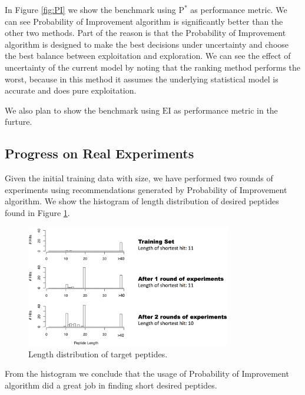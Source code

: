 \documentclass[opre,nonblindrev]{informs3} %
\newcommand{\EI}{\mathrm{EI}}
\newcommand{\PI}{\text{P}^*}
\begin{document}
In Figure \ref{fig:PI} we show the benchmark using $\PI$ as performance metric. We can see Probability of Improvement algorithm is significantly better than the other two methods. Part of the reason is that the Probability of Improvement algorithm is designed to make the best decisions under uncertainty and choose the best balance between exploitation and exploration. We can see the effect of uncertainty of the current model by noting that the ranking method performs the
worst, because in this method it assumes the underlying statistical model is accurate and does pure exploitation.

We also plan to show the benchmark using $\EI$ as performance metric in the furture.

\subsection{Progress on Real Experiments} \label{sec:experiment}
Given the initial training data with size, we have performed two rounds of experiments using recommendations generated by Probability of Improvement algorithm. We show the histogram of length distribution of desired peptides found in Figure \ref{fig:experiment}.
\begin{figure}[hpt] 
\center
\includegraphics[width=0.8\textwidth]{pic/experiment.png}
\caption{Length distribution of target peptides.}
\label{fig:experiment}
\end{figure}

From the histogram we conclude that the usage of Probability of Improvement algorithm did a great job in finding short desired peptides.
\end{document}
